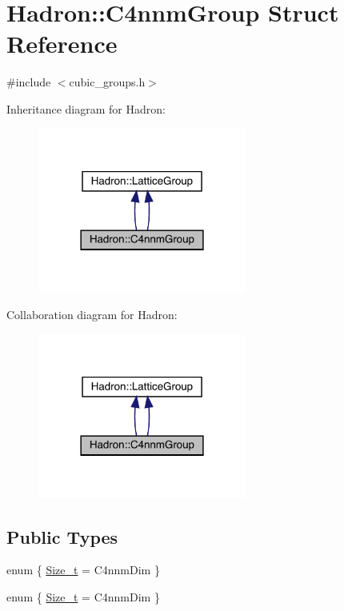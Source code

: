 \hypertarget{structHadron_1_1C4nnmGroup}{}\section{Hadron\+:\+:C4nnm\+Group Struct Reference}
\label{structHadron_1_1C4nnmGroup}


{\ttfamily \#include $<$cubic\+\_\+groups.\+h$>$}



Inheritance diagram for Hadron\+:\nopagebreak
\begin{figure}[H]
\begin{center}
\leavevmode
\includegraphics[width=194pt]{d9/d35/structHadron_1_1C4nnmGroup__inherit__graph}
\end{center}
\end{figure}


Collaboration diagram for Hadron\+:\nopagebreak
\begin{figure}[H]
\begin{center}
\leavevmode
\includegraphics[width=194pt]{dd/d70/structHadron_1_1C4nnmGroup__coll__graph}
\end{center}
\end{figure}
\subsection*{Public Types}
\begin{DoxyCompactItemize}
\item 
enum \{ \mbox{\hyperlink{structHadron_1_1C4nnmGroup_ad76f6d92d1084d57a297f0f1d636bb49a527688d454fbcf487d428a6e00eb561f}{Size\+\_\+t}} = C4nnm\+Dim
 \}
\item 
enum \{ \mbox{\hyperlink{structHadron_1_1C4nnmGroup_ad76f6d92d1084d57a297f0f1d636bb49a527688d454fbcf487d428a6e00eb561f}{Size\+\_\+t}} = C4nnm\+Dim
 \}
\end{DoxyCompactItemize}
